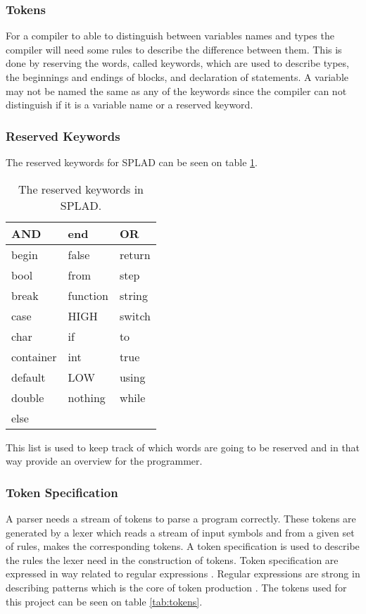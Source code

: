 \subsubsection{Tokens}
For a compiler to able to distinguish between variables names and types the compiler will need some rules to describe the difference between them. This is done by reserving the words, called keywords, which are used to describe types, the beginnings and endings of blocks, and declaration of statements. A variable may not be named the same as any of the keywords since the compiler can not distinguish if it is a variable name or a reserved keyword.

\subsubsection*{Reserved Keywords}
The reserved keywords for SPLAD can be seen on table \ref{tab:keywords}.

\begin{table}[H]
	\begin{tabular}{|l|l|l|}
		\hline
		AND			&	end			&	OR		\\ \hline
		begin 		&	false		&	return	\\ \hline
		bool 		&	from		&	step	\\ \hline
		break 		&	function	&	string	\\ \hline
		case 		&	HIGH		&	switch	\\ \hline
		char 		&	if			&	to		\\ \hline
		container 	&	int			&	true	\\ \hline
		default 	&	LOW			&	using	\\ \hline
		double 		&	nothing		&	while	\\ \hline
		else 		&	~			&	~		\\ \hline
	\end{tabular}
	\caption{The reserved keywords in SPLAD.}
	\label{tab:keywords}
\end{table}

This list is used to keep track of which words are going to be reserved and in that way provide an overview for the programmer. 

\subsubsection*{Token Specification}
A parser needs a stream of tokens to parse a program correctly. These tokens are generated by a lexer which reads a stream of input symbols and from a given set of rules, makes the corresponding tokens. A token specification is used to describe the rules the lexer need in the construction of tokens. Token specification are expressed in way related to regular expressions \citep{sebesta}. Regular expressions are strong in describing patterns which is the core of token production \citep{sipser}. The tokens used for this project can be seen on table \ref{tab:tokens}.

